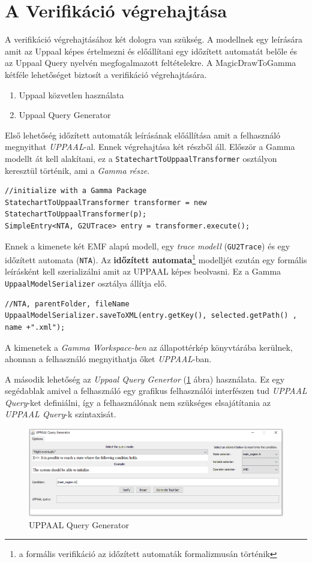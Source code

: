 \section{A Verifikáció végrehajtása}
A verifikáció végrehajtásához két dologra van szükség. A modellnek egy leírására amit az Uppaal képes értelmezni és előállítani egy időzített automatát belőle és az Uppaal Query nyelvén megfogalmazott feltételekre. A MagicDrawToGamma kétféle lehetőséget biztosít a verifikáció végrehajtására.

\begin{enumerate}
	\item Uppaal közvetlen használata
	\item Uppaal Query Generator
	\label{en:fels}
\end{enumerate}

Első lehetőség időzített automaták leírásának előállítása amit a felhasználó megnyithat \emph{UPPAAL}-al. Ennek végrehajtása két részből áll. Először a Gamma modellt át kell alakítani, ez a \verb+StatechartToUppaalTransformer+ osztályon keresztül történik, ami a \emph{Gamma része}.
\begin{lstlisting}
//initialize with a Gamma Package
StatechartToUppaalTransformer transformer = new StatechartToUppaalTransformer(p);
SimpleEntry<NTA, G2UTrace> entry = transformer.execute();
\end{lstlisting}
Ennek a kimenete két EMF alapú modell, egy \emph{trace modell} (\verb+GU2Trace+) és egy időzített automata (\verb+NTA+). Az \textbf{időzített automata}\footnote{a formális verifikáció az időzített automaták formalizmusán történik} modelljét ezután egy formális leírásként kell szerializálni amit az UPPAAL képes beolvasni. Ez a Gamma \verb+UppaalModelSerializer+ osztálya állítja elő. 
\begin{lstlisting}
//NTA, parentFolder, fileName
UppaalModelSerializer.saveToXML(entry.getKey(), selected.getPath() , name +".xml");
\end{lstlisting}
A kimenetek a \emph{Gamma Workspace-ben} az állapottérkép könyvtárába kerülnek, ahonnan a felhasználó megnyithatja őket \emph{UPPAAL}-ban.

A második lehetőség az \emph{Uppaal Query Genertor} (\ref{fig:upp-query-gen} ábra) használata. Ez egy segédablak amivel a felhasználó egy grafikus felhasználói interfészen tud \emph{UPPAAL Query}-ket definiálni, így a felhasználónak nem szükséges elsajátítania az \emph{UPPAAL Query}-k szintaxisát.

\begin{figure}[!ht]
	\centering
	\includegraphics[keepaspectratio, width=150mm]{figures/query-gen.png}
	\caption{UPPAAL Query Generator}
	\label{fig:upp-query-gen}
\end{figure}

